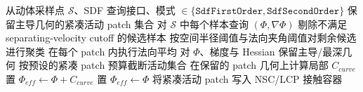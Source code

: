 \begin{algorithm}[htbp]
\caption{面向紧凑或奇异接触的 \texttt{CompactDiscrete} 流程}
\label{alg:compactdiscrete}
\begin{algorithmic}[1]
\Require 从动体采样点 $\mathcal{S}$、SDF 查询接口、模式 $\in \{\texttt{SdfFirstOrder},\texttt{SdfSecondOrder}\}$
\Ensure 保留主导几何的紧凑活动 patch 集合
\State 对 $\mathcal{S}$ 中每个样本查询 $(\Phi,\nabla \Phi)$
\State 剔除不满足 separating-velocity cutoff 的候选样本
\State 按空间半径阈值与法向夹角阈值对剩余候选进行聚类
\State 在每个 patch 内执行法向平均
\State 对 $\Phi$、梯度与 Hessian 保留主导/最深几何
\State 按预设的紧凑 patch 预算截断活动集合
    \State 在保留的 patch 几何上计算局部 $C_{curve}$
    \State 置 $\Phi_{eff} \gets \Phi + C_{curve}$
\Else
    \State 置 $\Phi_{eff} \gets \Phi$
\EndIf
\State 将紧凑活动 patch 写入 NSC/LCP 接触容器
\end{algorithmic}
\end{algorithm}
